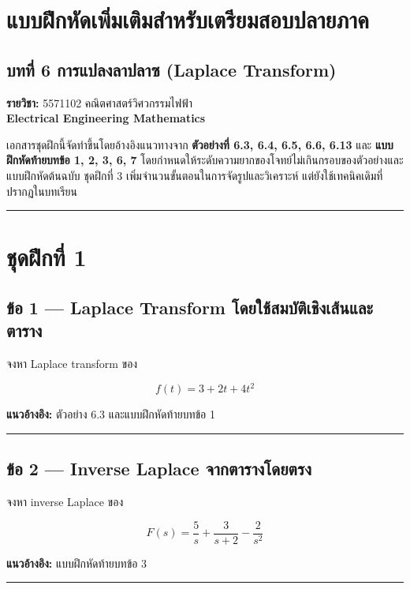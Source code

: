 \section{แบบฝึกหัดเพิ่มเติมสำหรับเตรียมสอบปลายภาค}
\subsection{บทที่ 6 การแปลงลาปลาซ (Laplace Transform)}

\textbf{รายวิชา:} 5571102 คณิตศาสตร์วิศวกรรมไฟฟ้า\\
\textbf{Electrical Engineering Mathematics}

เอกสารชุดฝึกนี้จัดทำขึ้นโดยอ้างอิงแนวทางจาก \textbf{ตัวอย่างที่ 6.3, 6.4, 6.5, 6.6, 6.13} และ \textbf{แบบฝึกหัดท้ายบทข้อ 1, 2, 3, 6, 7} โดยกำหนดให้ระดับความยากของโจทย์ไม่เกินกรอบของตัวอย่างและแบบฝึกหัดต้นฉบับ ชุดฝึกที่ 3 เพิ่มจำนวนขั้นตอนในการจัดรูปและวิเคราะห์ แต่ยังใช้เทคนิคเดิมที่ปรากฏในบทเรียน

\par\noindent\rule{\textwidth}{0.4pt}\par

\section{ชุดฝึกที่ 1}

\subsection{ข้อ 1 — Laplace Transform โดยใช้สมบัติเชิงเส้นและตาราง}

จงหา Laplace transform ของ

\[
f(t)=3+2t+4t^2
\]

\textbf{แนวอ้างอิง:} ตัวอย่าง 6.3 และแบบฝึกหัดท้ายบทข้อ 1

\par\noindent\rule{\textwidth}{0.4pt}\par

\subsection{ข้อ 2 — Inverse Laplace จากตารางโดยตรง}

จงหา inverse Laplace ของ

\[
F(s)=\frac{5}{s}+\frac{3}{s+2}-\frac{2}{s^2}
\]

\textbf{แนวอ้างอิง:} แบบฝึกหัดท้ายบทข้อ 3

\par\noindent\rule{\textwidth}{0.4pt}\par

